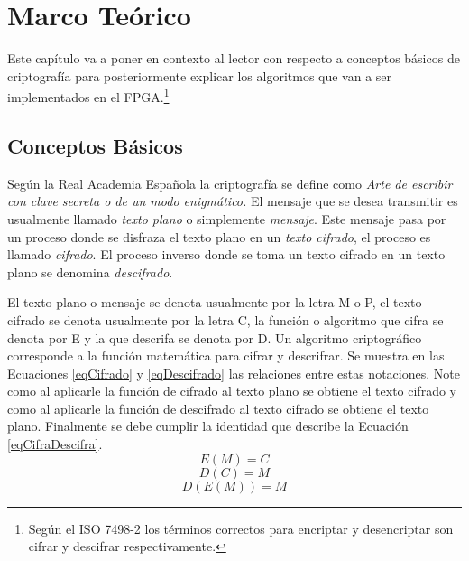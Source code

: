 \chapter{Marco Teórico}

Este capítulo va a poner en contexto al lector con respecto a conceptos básicos de criptografía para posteriormente explicar los algoritmos que van a ser implementados en el FPGA.\footnote{Según el ISO 7498-2 los términos correctos para encriptar y desencriptar son cifrar y descifrar respectivamente.}

\section{Conceptos Básicos}
Según la Real Academia Española \cite{bruce} la criptografía se define como 
\newline
\newline
\emph{Arte de escribir con clave secreta o de un modo enigmático.}
\newline
\newline
El mensaje que se desea transmitir es usualmente llamado \textit{texto plano} o simplemente \textit{mensaje}. Este mensaje pasa por un proceso donde se disfraza el texto plano en un \textit{texto cifrado}, el proceso es llamado \textit{cifrado}. El proceso inverso donde se toma un texto cifrado en un texto plano se denomina \textit{descifrado}. 

El texto plano o mensaje se denota usualmente por la letra M o P, el texto cifrado se denota usualmente por la letra C, la función o algoritmo que cifra se denota por E y la que descrifa se denota por D. Un algoritmo criptográfico corresponde a la función matemática para cifrar y descrifrar.
\newline
Se muestra en las Ecuaciones \ref{eqCifrado} y \ref{eqDescifrado} las relaciones entre estas notaciones. Note como al aplicarle la función de cifrado al texto plano se obtiene el texto cifrado y como al aplicarle la función de descifrado al texto cifrado se obtiene el texto plano. Finalmente se debe cumplir la identidad que describe la Ecuación \ref{eqCifraDescifra}. \cite{bruce}
\begin{equation} \label{eqCifrado}
E(M) = C
\end{equation}
\begin{equation} \label{eqDescifrado}
D(C) = M
\end{equation}
\begin{equation} \label{eqCifraDescifra}
D(E(M)) = M
\end{equation}


